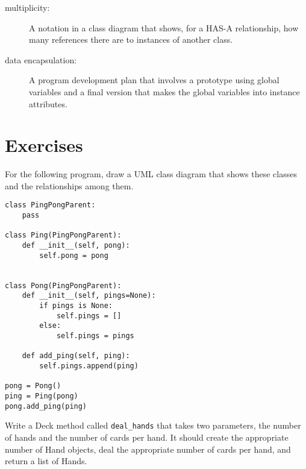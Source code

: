 \documentclass[
DIV=11,
fontsize=13,
twoside,
headinclude=false,
titlepage=firstiscover,
abstract=true,
headsepline=true,
footsepline=true,
chapterprefix=true, %
headings=big,
bibliography=totoc,%
captions=tableheading
]{scrbook}
\theoremstyle{definition}
\begin{document}
\begin{description}
\item[multiplicity:] A notation in a class diagram that shows, for
a HAS-A relationship, how many references there are to instances
of another class.

\item[data encapsulation:]  A program development plan that
involves a prototype using global variables and a final version
that makes the global variables into instance attributes. 

\end{description}


\section{Exercises}

\begin{exercise}
\normalfont
For the following program, draw a UML class diagram that shows
these classes and the relationships among them.

\begin{lstlisting}
class PingPongParent:
    pass

class Ping(PingPongParent):
    def __init__(self, pong):
        self.pong = pong


class Pong(PingPongParent):
    def __init__(self, pings=None):
        if pings is None:
            self.pings = []
        else:
            self.pings = pings

    def add_ping(self, ping):
        self.pings.append(ping)

pong = Pong()
ping = Ping(pong)
pong.add_ping(ping)
\end{lstlisting}


\end{exercise}



\begin{exercise}
\normalfont
Write a Deck method called \verb"deal_hands" that
takes two parameters, the number of hands and the number of cards per
hand.  It should create the appropriate number of Hand objects, deal
the appropriate number of cards per hand, and return a list of Hands.
\end{exercise}
\end{document}

